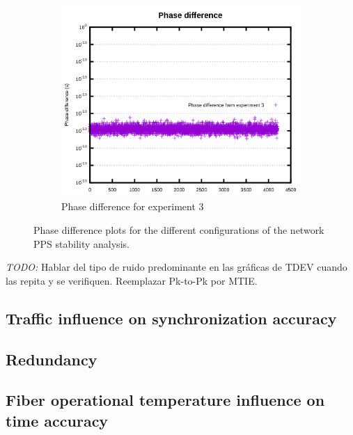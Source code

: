 \begin{figure}[H]
    ~
    \begin{subfigure}[t]{.3\textwidth}
        \centering
        \includegraphics[width=\textwidth]{img/prueba3_pd.png}
        \caption{Phase difference for experiment 3}
        \label{fig:prueba3_pd}
    \end{subfigure}
    \caption{Phase difference plots for the different configurations of the network PPS stability analysis.}
\end{figure}

\textit{TODO:} Hablar del tipo de ruido predominante en las gráficas de TDEV cuando las repita y se verifiquen. Reemplazar Pk-to-Pk por MTIE.

\subsection{Traffic influence on synchronization accuracy}


\subsection{Redundancy}


\subsection{Fiber operational temperature influence on time accuracy}

